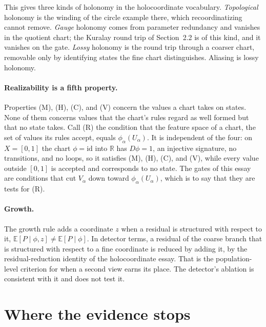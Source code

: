 \documentclass[11pt]{article}
\theoremstyle{definition}
\theoremstyle{remark}
\begin{document}
This gives three kinds of holonomy in the holocoordinate vocabulary. \emph{Topological} holonomy is the winding of the circle example there, which recoordinatizing cannot remove. \emph{Gauge} holonomy comes from parameter redundancy and vanishes in the quotient chart; the Kuralay round trip of Section~2.2 is of this kind, and it vanishes on the gate. \emph{Lossy} holonomy is the round trip through a coarser chart, removable only by identifying states the fine chart distinguishes. Aliasing is lossy holonomy.

\paragraph{Realizability is a fifth property.} Properties (M), (H), (C), and (V) concern the values a chart takes on states. None of them concerns values that the chart's rules regard as well formed but that no state takes. Call (R) the condition that the feature space of a chart, the set of values its rules accept, equals $\phi_\alpha(U_\alpha)$. It is independent of the four: on $X=[0,1]$ the chart $\phi=\mathrm{id}$ into $\mathbb R$ has $D\phi=1$, an injective signature, no transitions, and no loops, so it satisfies (M), (H), (C), and (V), while every value outside $[0,1]$ is accepted and corresponds to no state. The gates of this essay are conditions that cut $V_\alpha$ down toward $\phi_\alpha(U_\alpha)$, which is to say that they are tests for (R).

\paragraph{Growth.} The growth rule adds a coordinate $z$ when a residual is structured with respect to it, $\mathbb E[P\mid\phi,z]\neq\mathbb E[P\mid\phi]$. In detector terms, a residual of the coarse branch that is structured with respect to a fine coordinate is reduced by adding it, by the residual-reduction identity of the holocoordinate essay. That is the population-level criterion for when a second view earns its place. The detector's ablation is consistent with it and does not test it.

\section{Where the evidence stops}
\end{document}
